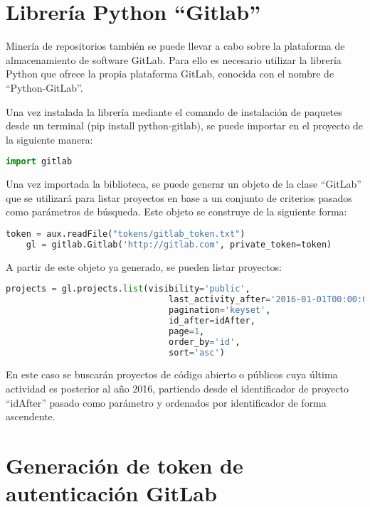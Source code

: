 \section{Librería Python ``Gitlab''}

Minería de repositorios también se puede llevar a cabo sobre la plataforma de almacenamiento de software GitLab. Para ello es necesario utilizar la librería Python que ofrece la propia plataforma GitLab, conocida con el nombre de ``Python-GitLab''.

Una vez instalada la librería mediante el comando de instalación de paquetes desde un terminal (pip install python-gitlab), se puede importar en el proyecto de la siguiente manera:

\begin{lstlisting}[language=Python]
    import gitlab
\end{lstlisting}

Una vez importada la biblioteca, se puede generar un objeto de la clase ``GitLab'' que se utilizará para listar proyectos en base a un conjunto de criterios pasados como parámetros de búsqueda. Este objeto se construye de la siguiente forma:

\begin{lstlisting}[language=Python, caption=Autenticación en API de GitLab]
    token = aux.readFile("tokens/gitlab_token.txt")
    gl = gitlab.Gitlab('http://gitlab.com', private_token=token)
\end{lstlisting}

A partir de este objeto ya generado, se pueden listar proyectos:

\begin{lstlisting}[language=Python]
    projects = gl.projects.list(visibility='public', 
                                last_activity_after='2016-01-01T00:00:00Z', 
                                pagination='keyset', 
                                id_after=idAfter, 
                                page=1, 
                                order_by='id', 
                                sort='asc')
\end{lstlisting}

En este caso se buscarán proyectos de código abierto o públicos cuya última actividad es posterior al año 2016, partiendo desde el identificador de proyecto ``idAfter'' pasado como parámetro y ordenados por identificador de forma ascendente.

\section{Generación de token de autenticación GitLab}

